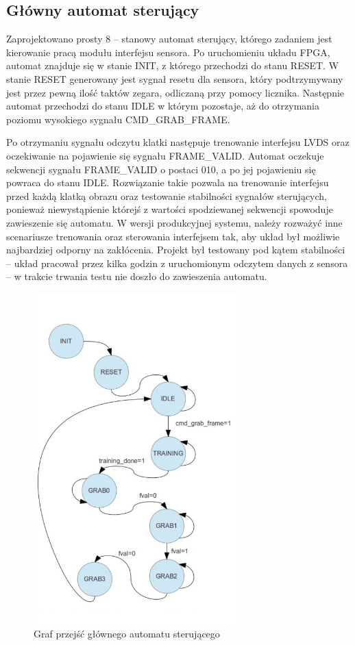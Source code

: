 \documentclass[a4paper,11pt,oneside]{report}  %
\begin{document}
\subsection{Główny automat sterujący}


Zaprojektowano prosty 8 – stanowy automat sterujący, którego zadaniem jest kierowanie pracą modułu interfejsu sensora. Po uruchomieniu układu FPGA, automat znajduje się w stanie INIT, z którego przechodzi do stanu RESET. W stanie RESET generowany jest sygnał resetu dla sensora, który podtrzymywany jest przez pewną ilość taktów zegara, odliczaną przy pomocy licznika. Następnie automat przechodzi do stanu IDLE w którym pozostaje, aż do otrzymania poziomu wysokiego sygnału CMD\_GRAB\_FRAME. 

Po otrzymaniu sygnału odczytu klatki następuje trenowanie interfejsu LVDS oraz oczekiwanie na pojawienie się sygnału FRAME\_VALID. Automat oczekuje sekwencji sygnału FRAME\_VALID o postaci 010, a po jej pojawieniu się powraca do stanu IDLE. Rozwiązanie takie pozwala na trenowanie interfejsu przed każdą klatką obrazu oraz testowanie stabilności sygnałów sterujących, ponieważ niewystąpienie którejś z wartości spodziewanej sekwencji spowoduje zawieszenie się automatu. W wersji produkcyjnej systemu, należy rozważyć inne scenariusze trenowania oraz sterowania interfejsem tak, aby układ był możliwie najbardziej odporny na zakłócenia. Projekt był testowany pod kątem stabilności – układ pracował przez kilka godzin z uruchomionym odczytem danych z sensora – w trakcie trwania testu nie doszło do zawieszenia automatu.

\begin{figure}[H]
	\centering
	\includegraphics[width=8cm]{data6.png}
	\caption{Graf przejść głównego automatu sterującego}
	\label{fig:Zynq6}
\end{figure}
\end{document}
